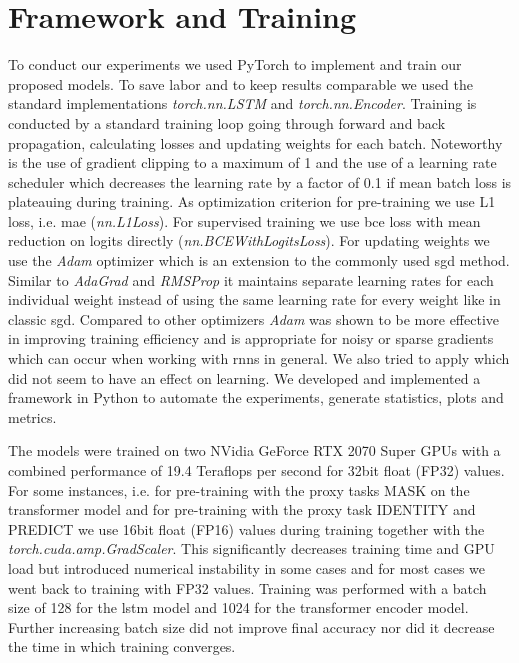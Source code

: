 \section{Framework and Training} \label{sec:methodology:freamework_and_training}

To conduct our experiments we used PyTorch \cite{pytorch} to implement and train our proposed models. To save labor and to keep results comparable we used the standard implementations \textit{torch.nn.LSTM} and \textit{torch.nn.Encoder}. Training is conducted by a standard training loop going through forward and back propagation, calculating losses and updating weights for each batch. Noteworthy is the use of gradient clipping to a maximum of 1 and the use of a learning rate scheduler which decreases the learning rate by a factor of 0.1 if mean batch loss is plateauing during training. As optimization criterion for pre-training we use L1 loss, i.e. \gls{mae} (\textit{nn.L1Loss}). For supervised training we use \gls{bce} loss with mean reduction on logits directly (\textit{nn.BCEWithLogitsLoss}).
For updating weights we use the \textit{Adam} optimizer \cite{adam} which is an extension to the commonly used \gls{sgd} method. Similar to \textit{AdaGrad} \cite{optimizer_comparison} and \textit{RMSProp} \cite{optimizer_comparison} it maintains separate learning rates for each individual weight instead of using the same learning rate for every weight like in classic \gls{sgd}. Compared to other optimizers \textit{Adam} was shown to be more effective in improving training efficiency \cite{adam} and is appropriate for noisy or sparse gradients which can occur when working with \glspl{rnn} in general. We also tried to apply \cite{AdamW} which did not seem to have an effect on learning.
We developed and implemented a framework in Python to automate the experiments, generate statistics, plots and metrics. \par
The models were trained on two NVidia GeForce RTX 2070 Super GPUs with a combined performance of 19.4 Teraflops per second for 32bit float (FP32) values. For some instances, i.e. for pre-training with the proxy tasks MASK on the transformer model and for pre-training with the proxy task IDENTITY and PREDICT we use 16bit float (FP16) values during training together with the \textit{torch.cuda.amp.GradScaler}. This significantly decreases training time and GPU load but introduced numerical instability in some cases and for most cases we went back to training with FP32 values. Training was performed with a batch size of 128 for the \gls{lstm} model and 1024 for the transformer encoder model. Further increasing batch size did not improve final accuracy nor did it decrease the time in which training converges. \par

